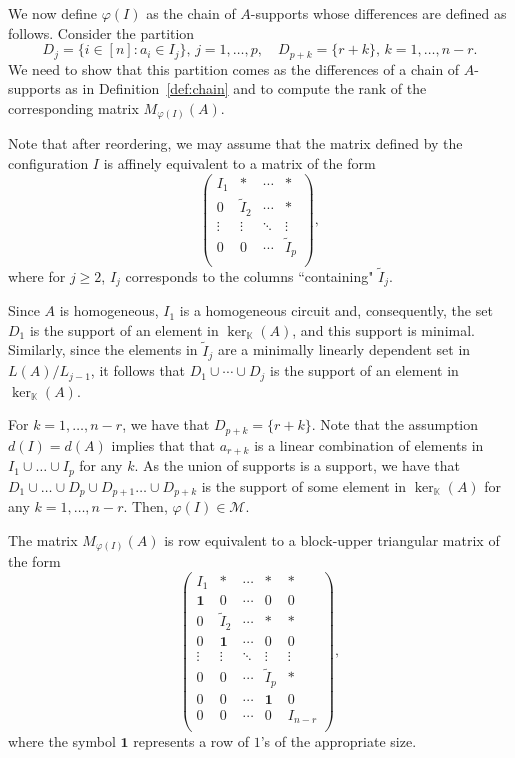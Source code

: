 \documentclass[11pt]{amsart}
\theoremstyle{plain}
\theoremstyle{definition}
\theoremstyle{remark}
\renewcommand{\k}{{\mathbb K}}
\numberwithin{equation}{section}
\begin{document}
We now define $\varphi(I)$ as the chain of $A$-supports whose differences are defined as follows.  Consider the partition
$$D_j = \{i\in [n] : a_i \in I_j\}, \,  j=1,\dots,p, \quad
D_{p+k} = \{r+k\}, \,  k=1,\dots,n  - r.$$
We need to show that this partition comes as the differences of a chain of $A$-supports as in Definition~\ref{def:chain}
and to compute the rank of the corresponding matrix $M_{\varphi(I)}(A)$.

Note that after reordering, we may assume that the matrix defined by the configuration $I$ is affinely equivalent to a matrix of the form
\begin{equation}\label{eq:ic}
 \left(\begin{array}{cccc}
 I_1 & * & \cdots & *\\
0 & \tilde I_2 & \cdots & *\\
 \vdots & \vdots & \ddots & \vdots\\
0&0 & \cdots &\tilde  I_p \\
\end{array}\right),
\end{equation}
where for $j\geq 2$, $I_j$ corresponds to the columns ``containing" $
\tilde I_j$.  

Since $A$ is homogeneous, $I_1$ is a homogeneous circuit and, consequently, the set $D_1$ 
is the support of an element in $\ker_\k(A)$, and this support is minimal. Similarly, 
since the elements in $\tilde I_j$ are a minimally linearly dependent set in $L(A)/L_{j-1}$, it follows that 
$D_1 \cup \cdots \cup D_j$ is the support of an element in  $\ker_\k (A)$.
 

For $k = 1, \dots, n  - r$, we have that $D_{p+k} = \{r+k\}$.
Note that the assumption $d(I) = d(A) $ implies that 
 that  $a_{r+k}$
is a linear combination of  elements in $I_1 \cup \dots \cup I_p$ for any $k$. As the union of supports is a support,
 we have that $D_1 \cup \dots \cup D_p \cup D_{p+1}\dots \cup D_{p+k}$ 
is the support of some element in $\ker_\k (A)$ for any $k=1, \dots, n-r$.  Then, $\varphi(I)  \in \mathcal M$.  

The matrix $M_{\varphi(I)}(A)$ is row equivalent to a block-upper triangular matrix of the form
\begin{equation}\label{eq:ic2}
 \left(\begin{array}{ccccc}
 I_1 & * & \cdots & * & * \\
  {\mathbf 1} & 0 & \cdots & 0 & 0\\
0 & \tilde I_2 & \cdots & *& * \\
0 & {\mathbf 1} & \cdots & 0 & 0 \\
 \vdots & \vdots & \ddots & \vdots& \vdots\\
0&0 & \cdots &\tilde  I_p& *  \\
0&0 & \cdots &  {\mathbf 1}& 0  \\
0&0 & \cdots &  0& I_{ n-r}  \\\end{array}\right),
\end{equation}
where the symbol ${\mathbf 1}$ represents a row of $1$'s of the appropriate size.
\end{document}

